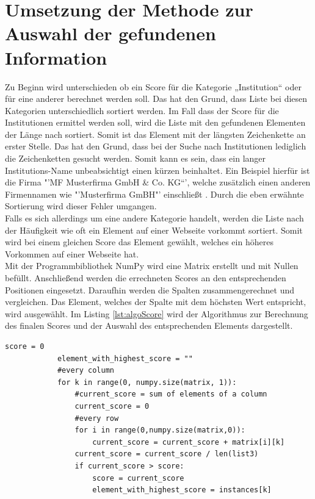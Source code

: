 \section{Umsetzung der Methode zur Auswahl der gefundenen Information}
\label{subsec:AuswahlInformation}
Zu Beginn wird unterschieden ob ein Score für die Kategorie „Institution“ oder für eine anderer berechnet werden soll. Das hat den Grund, dass Liste bei diesen Kategorien unterschiedlich sortiert werden. Im Fall dass der Score für die Institutionen  ermittel werden soll, wird die Liste mit den gefundenen Elementen der Länge nach sortiert. Somit ist das Element mit der längsten Zeichenkette an erster Stelle. Das hat den Grund, dass bei der Suche nach Institutionen lediglich die Zeichenketten gesucht werden. Somit kann es sein, dass ein langer Institutions-Name unbeabsichtigt einen kürzen beinhaltet. Ein Beispiel hierfür ist die Firma "'MF Musterfirma GmbH \& Co. KG“', welche zusätzlich einen anderen Firmennamen wie "'Musterfirma GmBH"' einschließt . Durch die eben erwähnte Sortierung wird dieser Fehler umgangen. \\
Falls es sich allerdings um eine andere Kategorie handelt, werden die Liste nach der Häufigkeit wie oft ein Element auf einer Webseite vorkommt sortiert. Somit wird bei einem gleichen Score das Element gewählt, welches ein höheres Vorkommen auf einer Webseite hat.\\
Mit der Programmbibliothek  NumPy wird eine Matrix erstellt und mit Nullen befüllt. Anschließend werden die errechneten Scores an den entsprechenden Positionen eingesetzt. Daraufhin werden die Spalten zusammengerechnet und vergleichen. Das Element, welches der Spalte mit dem höchsten Wert entspricht, wird ausgewählt. Im Listing \ref{lst:algoScore} wird der Algorithmus zur Berechnung des finalen Scores und der  Auswahl des entsprechenden Elements dargestellt.\\
\newpage
		\begin{lstlisting}[caption=Algorithmus zur Berechnung des Scores und der Auswahl des Elementes mit dem höchsten Score,label={lst:algoScore}]
			score = 0
			element_with_highest_score = ""
			#every column
			for k in range(0, numpy.size(matrix, 1)):
				#current_score = sum of elements of a column
				current_score = 0
				#every row
				for i in range(0,numpy.size(matrix,0)):
					current_score = current_score + matrix[i][k]
				current_score = current_score / len(list3)
				if current_score > score:
					score = current_score
					element_with_highest_score = instances[k]
		\end{lstlisting}

